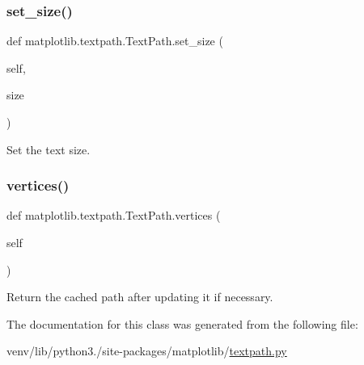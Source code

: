 \subsubsection{\texorpdfstring{set\+\_\+size()}{set\_size()}}
{\footnotesize\ttfamily def matplotlib.\+textpath.\+Text\+Path.\+set\+\_\+size (\begin{DoxyParamCaption}\item[{}]{self,  }\item[{}]{size }\end{DoxyParamCaption})}

\begin{DoxyVerb}Set the text size.\end{DoxyVerb}
 \mbox{\label{classmatplotlib_1_1textpath_1_1TextPath_af1a6127a9fae5aa4cd72ce585252c79f}} 
\subsubsection{\texorpdfstring{vertices()}{vertices()}}
{\footnotesize\ttfamily def matplotlib.\+textpath.\+Text\+Path.\+vertices (\begin{DoxyParamCaption}\item[{}]{self }\end{DoxyParamCaption})}

\begin{DoxyVerb}Return the cached path after updating it if necessary.
\end{DoxyVerb}
 

The documentation for this class was generated from the following file\+:\begin{DoxyCompactItemize}
\item 
venv/lib/python3./site-\/packages/matplotlib/\hyperlink{textpath_8py}{textpath.\+py}\end{DoxyCompactItemize}

